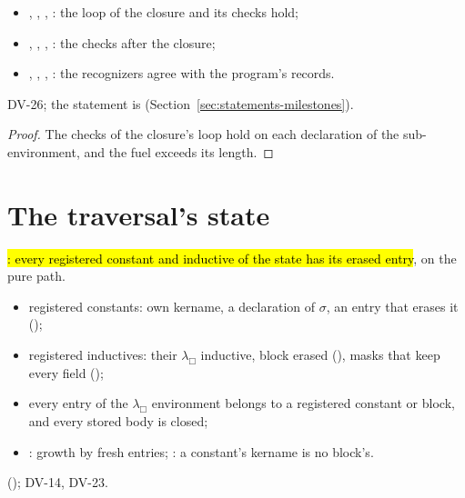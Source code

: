 \begin{lemma}
\begin{itemize}
  \item {}, , , : the loop of the closure and its checks hold;
  \item {}, , , : the checks after the closure;
  \item {}, , , : the recognizers agree with the program's records.
  \end{itemize}
   DV-26; the statement is  (Section~\ref{sec:statements-milestones}).
\end{lemma}
\begin{proof}
  \leanok
   The checks of the closure's loop hold on each declaration of the sub-environment, and the fuel exceeds its length.
\end{proof}

\section{The traversal's state}\label{sec:core-state}

\begin{definition}
  \label{def:EraseProof-StateOK}
  \leanok
   \hl{: every registered constant and inductive of the state has its erased entry}, on the pure path.
  \begin{itemize}
  \item registered constants: own kername, a declaration of $\sigma$, an entry that erases it ();
  \item registered inductives: their $\lambda_\Box$ inductive, block erased (), masks that keep every field ();
  \item every entry of the $\lambda_\Box$ environment belongs to a registered constant or block, and every stored body is closed;
  \item {}: growth by fresh entries; : a constant's kername is no block's.
  \end{itemize}
    (); DV-14, DV-23.
\end{definition}

